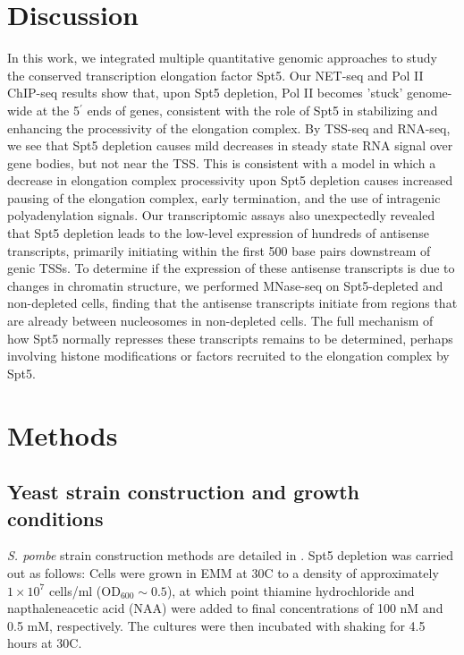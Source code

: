 \section{Discussion}

In this work, we integrated multiple quantitative genomic approaches to study the conserved transcription elongation factor Spt5.
Our NET-seq and Pol II ChIP-seq results show that, upon Spt5 depletion, Pol II becomes 'stuck' genome-wide at the 5$^\prime$ ends of genes, consistent with the role of Spt5 in stabilizing and enhancing the processivity of the elongation complex.
By TSS-seq and RNA-seq, we see that Spt5 depletion causes mild decreases in steady state RNA signal over gene bodies, but not near the TSS.
This is consistent with a model in which a decrease in elongation complex processivity upon Spt5 depletion causes increased pausing of the elongation complex, early termination, and the use of intragenic polyadenylation signals.
Our transcriptomic assays also unexpectedly revealed that Spt5 depletion leads to the low-level expression of hundreds of antisense transcripts, primarily initiating within the first 500 base pairs downstream of genic TSSs.
To determine if the expression of these antisense transcripts is due to changes in chromatin structure, we performed MNase-seq on Spt5-depleted and non-depleted cells, finding that the antisense transcripts initiate from regions that are already between nucleosomes in non-depleted cells.
The full mechanism of how Spt5 normally represses these transcripts remains to be determined, perhaps involving histone modifications or factors recruited to the elongation complex by Spt5.

\section{Methods}

\subsection{Yeast strain construction and growth conditions}

\textit{S. pombe} strain construction methods are detailed in \citet{shetty2017}.
Spt5 depletion was carried out as follows: Cells were grown in EMM at 30\textdegree C to a density of approximately $1 \times 10^7$ cells/ml ($\text{OD}_{600} \sim 0.5$), at which point thiamine hydrochloride and napthaleneacetic acid (NAA) were added to final concentrations of 100 nM and 0.5 mM, respectively.
The cultures were then incubated with shaking for 4.5 hours at 30\textdegree C.

